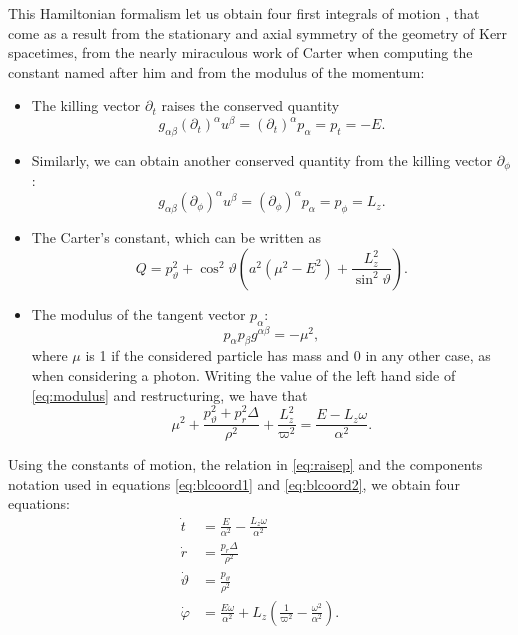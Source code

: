 This Hamiltonian formalism let us obtain four first integrals of motion \cite[pp. 898-899]{thorne73}, that come as a result from the stationary and axial symmetry of the geometry of Kerr spacetimes, from the nearly miraculous work of Carter when computing the constant named after him \cite{carter68} and from the modulus of the momentum:
\begin{itemize}
	\item The killing vector $\partial_t$ raises the conserved quantity
	\begin{equation}
	\label{eq:conservedpt}
	g_{\alpha\beta}(\partial_t)^\alpha u^\beta = (\partial_t)^\alpha p_\alpha = p_t = -E.
	\end{equation}
	\item Similarly, we can obtain another conserved quantity from the killing vector $\partial_\phi$:
	\begin{equation}
	\label{eq:conservedpphi}
	g_{\alpha\beta}(\partial_\phi)^\alpha u^\beta = (\partial_\phi)^\alpha p_\alpha = p_\phi = L_z.
	\end{equation}
	\item The Carter's constant, which can be written as
	\begin{equation}
	\label{eq:carter}
	Q = p_\vartheta^2 + \cos^2\vartheta \left( a^2 \left( \mu^2 - E^2 \right) + \frac{L_z^2}{\sin^2\vartheta} \right).
	\end{equation}
	\item The modulus of the tangent vector $p_\alpha$:
	\begin{equation}
	\label{eq:modulus}
	p_\alpha p_\beta g^{\alpha\beta} = -\mu^2,
	\end{equation}
	where $\mu$ is 1 if the considered particle has mass and 0 in any other case, as when considering a photon. Writing the value of the left hand side of \autoref{eq:modulus} and restructuring, we have that
	\[
	\mu^2 + \frac{p_\vartheta^2 + p_r^2 \Delta}{\rho^2} + \frac{L_z^2}{\varpi^2} = \frac{E - L_z \omega}{\alpha^2}.
	\]
\end{itemize}


Using the constants of motion, the relation in \autoref{eq:raisep} and the components notation used in equations \ref{eq:blcoord1} and  \ref{eq:blcoord2}, we obtain four equations:
\begin{align}
\label{eq:initt}
\dot{t} &= \frac{E}{\alpha^2} - \frac{L_z \omega}{\alpha^2} \\
\label{eq:initr}
\dot{r} &= \frac{p_r \Delta}{\rho^2} \\
\label{eq:inittheta}
\dot{\vartheta} &= \frac{p_\vartheta}{\rho^2} \\
\label{eq:initphi}
\dot{\varphi} &= \frac{E \omega}{\alpha^2} + L_z\left( \frac{1}{\varpi^2} - \frac{\omega^2}{\alpha^2} \right).
\end{align}

